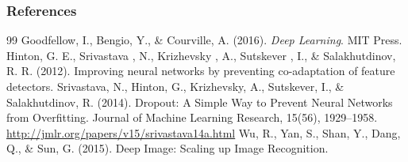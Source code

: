\documentclass[11pt,compress,t,notes=noshow, xcolor=table]{beamer}
\begin{document}
\begin{vbframe}
\frametitle{References}
\footnotesize{
\begin{thebibliography}{99}
 Goodfellow, I., Bengio, Y., \& Courville, A. (2016). \textit{Deep Learning}. MIT Press. 
 Hinton, G. E., Srivastava , N., Krizhevsky , A., Sutskever , I., \& Salakhutdinov, R. R. (2012). Improving neural networks by preventing co-adaptation of feature detectors. 
     Srivastava, N., Hinton, G., Krizhevsky, A., Sutskever, I., \& Salakhutdinov, R. (2014). Dropout: A Simple Way to Prevent Neural Networks from Overfitting. Journal of Machine Learning Research, 15(56), 1929–1958. \url{http://jmlr.org/papers/v15/srivastava14a.html}
 Wu, R., Yan, S., Shan, Y., Dang, Q., \& Sun, G. (2015). Deep Image: Scaling up Image Recognition. 


\end{thebibliography}
}
\end{vbframe}

\endlecture
\end{document}
